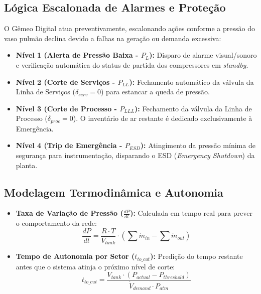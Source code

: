 \documentclass[12pt,a4paper]{article}
\numberwithin{equation}{section}
\numberwithin{table}{section}
\numberwithin{figure}{section}
\begin{document}
\subsection{Lógica Escalonada de Alarmes e Proteção}

O Gêmeo Digital atua preventivamente, escalonando ações conforme a pressão do vaso pulmão declina devido a falhas na geração ou demanda excessiva:

\begin{itemize}
	\item \textbf{Nível 1 (Alerta de Pressão Baixa - $P_{L}$):} Disparo de alarme visual/sonoro e verificação automática do status de partida dos compressores em \textit{standby}.
	\item \textbf{Nível 2 (Corte de Serviços - $P_{LL}$):} Fechamento automático da válvula da Linha de Serviços ($\delta_{serv} = 0$) para estancar a queda de pressão.
	\item \textbf{Nível 3 (Corte de Processo - $P_{LLL}$):} Fechamento da válvula da Linha de Processo ($\delta_{proc} = 0$). O inventário de ar restante é dedicado exclusivamente à Emergência.
	\item \textbf{Nível 4 (Trip de Emergência - $P_{ESD}$):} Atingimento da pressão mínima de segurança para instrumentação, disparando o ESD (\textit{Emergency Shutdown}) da planta.
\end{itemize}

\subsection{Modelagem Termodinâmica e Autonomia}

\begin{itemize}
	\item \textbf{Taxa de Variação de Pressão ($\frac{dP}{dt}$):}
	Calculada em tempo real para prever o comportamento da rede:
	\begin{equation}\label{eq:s16-4}
\frac{dP}{dt} = \frac{R \cdotp T}{V_{tank}} \cdotp \left( \sum \dot{m}_{in} - \sum \dot{m}_{out} \right)
\end{equation}
	\item \textbf{Tempo de Autonomia por Setor ($t_{to\_cut}$):}
	Predição do tempo restante antes que o sistema atinja o próximo nível de corte:
	\begin{equation}\label{eq:s16-5}
t_{to\_cut} = \frac{V_{tank} \cdotp (P_{actual} - P_{threshold})}{\dot{V}_{demand} \cdotp P_{atm}}
\end{equation}
\end{itemize}
\end{document}
